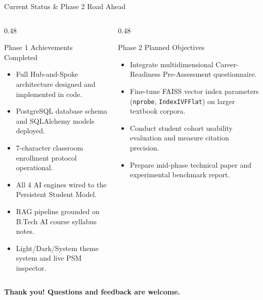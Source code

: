 \documentclass[aspectratio=169,10pt]{beamer}
\begin{document}
\begin{frame}{Current Status & Phase 2 Road Ahead}
  \begin{columns}[T]
    \begin{column}{0.48\textwidth}
      \begin{block}{Phase 1 Achievements Completed}
        \begin{itemize}
          \item Full Hub-and-Spoke architecture designed and implemented in code.
          \item PostgreSQL database schema and SQLAlchemy models deployed.
          \item 7-character classroom enrollment protocol operational.
          \item All 4 AI engines wired to the Persistent Student Model.
          \item RAG pipeline grounded on B.Tech AI course syllabus notes.
          \item Light/Dark/System theme system and live PSM inspector.
        \end{itemize}
      \end{block}
    \end{column}
    \begin{column}{0.48\textwidth}
      \begin{block}{Phase 2 Planned Objectives}
        \begin{itemize}
          \item Integrate multidimensional Career-Readiness Pre-Assessment questionnaire.
          \item Fine-tune FAISS vector index parameters (\texttt{nprobe}, \texttt{IndexIVFFlat}) on larger textbook corpora.
          \item Conduct student cohort usability evaluation and measure citation precision.
          \item Prepare mid-phase technical paper and experimental benchmark report.
        \end{itemize}
      \end{block}
    \end{column}
  \end{columns}
  \vspace{0.3cm}
  \begin{center}
    \textbf{Thank you! Questions and feedback are welcome.}
  \end{center}
\end{frame}
\end{document}
